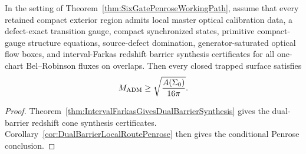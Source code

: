 \begin{corollary}\label{cor:IntervalFarkasLocalRoutePenrose}
In the setting of Theorem~\ref{thm:SixGatePenroseWorkingPath}, assume that every
retained compact exterior region admits local master optical calibration data, a
defect-exact transition gauge, compact synchronized states, primitive
compact-gauge structure equations, source-defect domination, generator-saturated
optical flow boxes, and interval-Farkas redshift barrier synthesis certificates
for all one-chart Bel--Robinson fluxes on overlaps. Then every closed trapped
surface satisfies
\[
    M_{\mathrm{ADM}}\ge \sqrt{\frac{A(\Sigma_0)}{16\pi}} .
\]
\end{corollary}

\begin{proof}
Theorem~\ref{thm:IntervalFarkasGivesDualBarrierSynthesis} gives the
dual-barrier redshift cone synthesis certificates.  Corollary~\ref{cor:DualBarrierLocalRoutePenrose}
then gives the conditional Penrose conclusion.
\end{proof}

